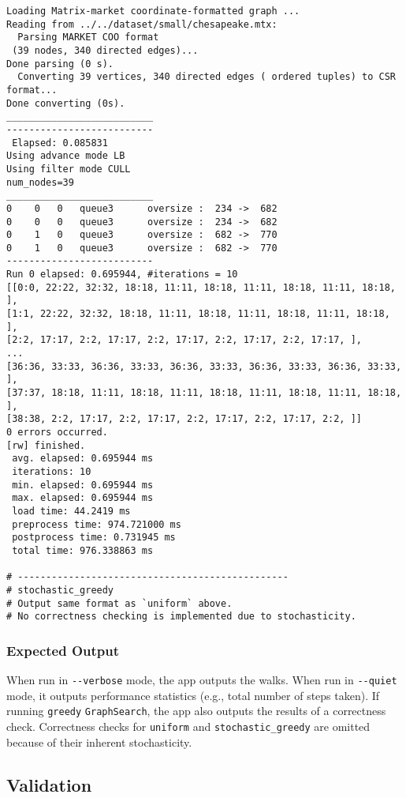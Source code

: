 \documentclass[10pt,oneside]{memoir}
\begin{document}
\begin{verbatim}
Loading Matrix-market coordinate-formatted graph ...
Reading from ../../dataset/small/chesapeake.mtx:
  Parsing MARKET COO format
 (39 nodes, 340 directed edges)...
Done parsing (0 s).
  Converting 39 vertices, 340 directed edges ( ordered tuples) to CSR format...
Done converting (0s).
__________________________
--------------------------
 Elapsed: 0.085831
Using advance mode LB
Using filter mode CULL
num_nodes=39
__________________________
0    0   0   queue3      oversize :  234 ->  682
0    0   0   queue3      oversize :  234 ->  682
0    1   0   queue3      oversize :  682 ->  770
0    1   0   queue3      oversize :  682 ->  770
--------------------------
Run 0 elapsed: 0.695944, #iterations = 10
[[0:0, 22:22, 32:32, 18:18, 11:11, 18:18, 11:11, 18:18, 11:11, 18:18, ],
[1:1, 22:22, 32:32, 18:18, 11:11, 18:18, 11:11, 18:18, 11:11, 18:18, ],
[2:2, 17:17, 2:2, 17:17, 2:2, 17:17, 2:2, 17:17, 2:2, 17:17, ],
...
[36:36, 33:33, 36:36, 33:33, 36:36, 33:33, 36:36, 33:33, 36:36, 33:33, ],
[37:37, 18:18, 11:11, 18:18, 11:11, 18:18, 11:11, 18:18, 11:11, 18:18, ],
[38:38, 2:2, 17:17, 2:2, 17:17, 2:2, 17:17, 2:2, 17:17, 2:2, ]]
0 errors occurred.
[rw] finished.
 avg. elapsed: 0.695944 ms
 iterations: 10
 min. elapsed: 0.695944 ms
 max. elapsed: 0.695944 ms
 load time: 44.2419 ms
 preprocess time: 974.721000 ms
 postprocess time: 0.731945 ms
 total time: 976.338863 ms

# ------------------------------------------------
# stochastic_greedy
# Output same format as `uniform` above.
# No correctness checking is implemented due to stochasticity.
\end{verbatim}

\hypertarget{expected-output-1}{%
\subsubsection{Expected Output}\label{expected-output-1}}

When run in \texttt{-\/-verbose} mode, the app outputs the walks. When
run in \texttt{-\/-quiet} mode, it outputs performance statistics (e.g.,
total number of steps taken). If running \texttt{greedy}
\texttt{GraphSearch}, the app also outputs the results of a correctness
check. Correctness checks for \texttt{uniform} and
\texttt{stochastic\_greedy} are omitted because of their inherent
stochasticity.

\hypertarget{validation}{%
\subsection{Validation}\label{validation}}
\end{document}
